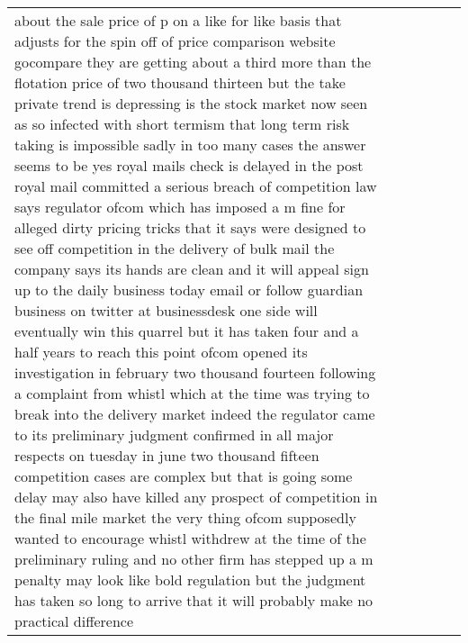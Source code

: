 \documentclass[]{article}
\begin{document}
\begin{table}[!h]
\begin{tabular}[t]{llllll}
about the sale price of p on a like for like basis that adjusts for the spin off of price comparison website gocompare they are getting about a third more than the flotation price of two thousand thirteen but the take private trend is depressing is the stock market now seen as so infected with short termism that long term risk taking is impossible sadly in too many cases the answer seems to be yes royal mails check is delayed in the post royal mail committed a serious breach of competition law says regulator ofcom which has imposed a m fine for alleged dirty pricing tricks that it says were designed to see off competition in the delivery of bulk mail the company says its hands are clean and it will appeal sign up to the daily business today email or follow guardian business on twitter at businessdesk one side will eventually win this quarrel but it has taken four and a half years to reach this point ofcom opened its investigation in february two thousand fourteen following a complaint from whistl which at the time was trying to break into the delivery market indeed the regulator came to its preliminary judgment confirmed in all major respects on tuesday in june two thousand fifteen competition cases are complex but that is going some delay may also have killed any prospect of competition in the final mile market the very thing ofcom supposedly wanted to encourage whistl withdrew at the time of the preliminary ruling and no other firm has stepped up a m penalty may look like bold regulation but the judgment has taken so long to arrive that it will probably make no practical difference\\

\end{tabular}
\end{table}
\end{document}
